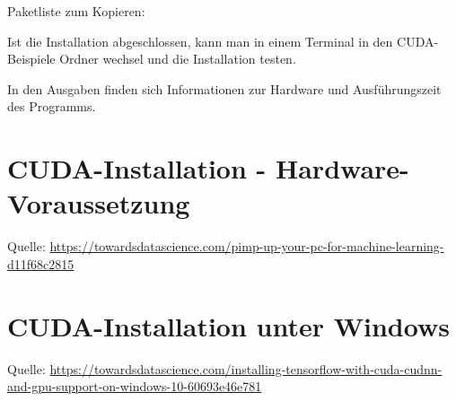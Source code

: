 \bigskip

Paketliste zum Kopieren: 

\medskip


\bigskip

Ist die Installation abgeschlossen, kann man in einem Terminal in den CUDA-Beispiele Ordner wechsel und die Installation testen.

\medskip
 





\medskip

In den Ausgaben finden sich Informationen zur Hardware und Ausführungszeit des Programms.



\chapter{CUDA-Installation - Hardware-Voraussetzung}


{\tiny Quelle: \url{https://towardsdatascience.com/pimp-up-your-pc-for-machine-learning-d11f68c2815}}

\chapter{CUDA-Installation unter Windows}

{\tiny Quelle: \url{https://towardsdatascience.com/installing-tensorflow-with-cuda-cudnn-and-gpu-support-on-windows-10-60693e46e781}}

